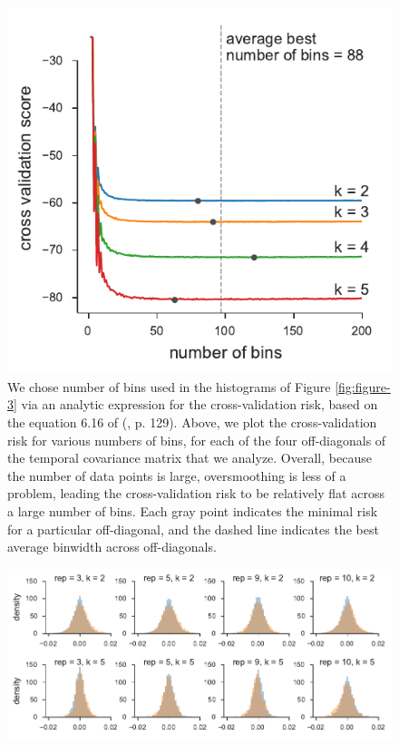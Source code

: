 \documentclass[11pt]{article}
\begin{document}
{{\begin{figure}[!ht]
  \centering
  \includegraphics[]{figures/barghi-cross-validation-binsize.pdf}

  \caption{We chose number of bins used in the histograms of Figure
    \ref{fig:figure-3} via an analytic expression for the cross-validation
    risk, based on the equation 6.16 of (\cite{Wasserman2006-jl}, p. 129).
    Above, we plot the cross-validation risk for various numbers of bins, for
    each of the four off-diagonals of the temporal covariance matrix that we
    analyze. Overall, because the number of data points is large, oversmoothing
    is less of a problem, leading the cross-validation risk to be relatively
    flat across a large number of bins. Each gray point indicates the minimal
    risk for a particular off-diagonal, and the dashed line indicates the best
    average binwidth across off-diagonals.}
  \label{suppfig:barghi-cross-validation-binsize}
\end{figure}



\begin{figure}[!ht]
  \centering
  \includegraphics[]{figures/barghi-offset-replicate-panels.pdf}


\end{figure}}}
\end{document}
